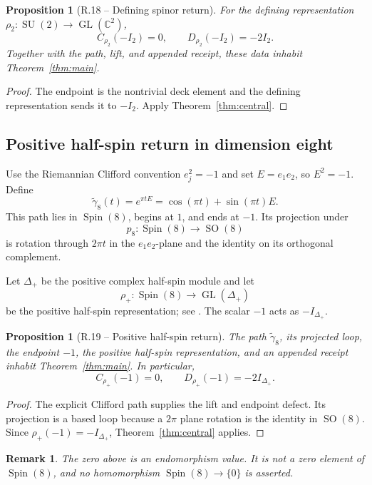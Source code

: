 \documentclass[11pt,letterpaper]{article}
\theoremstyle{returnstyle}
\newtheorem{proposition}[theorem]{Proposition}
\newtheorem{remark}[theorem]{Remark}
\newcommand{\C}{\mathbb{C}}
\newcommand{\GL}{\operatorname{GL}}
\newcommand{\SO}{\operatorname{SO}}
\newcommand{\SU}{\operatorname{SU}}
\newcommand{\Spin}{\operatorname{Spin}}
\begin{document}
\begin{proposition}[R.18 -- Defining spinor return]
For the defining representation $\rho_2:\SU(2)\to\GL(\C^2)$,
\[
C_{\rho_2}(-I_2)=0,
\qquad
D_{\rho_2}(-I_2)=-2I_2.
\]
Together with the path, lift, and appended receipt, these data inhabit Theorem~\ref{thm:main}.
\end{proposition}

\begin{proof}
The endpoint is the nontrivial deck element and the defining representation sends it to $-I_2$.  Apply Theorem~\ref{thm:central}.
\end{proof}

\subsection{Positive half-spin return in dimension eight}

Use the Riemannian Clifford convention $e_j^2=-1$ and set $E=e_1e_2$, so $E^2=-1$.  Define
\[
\widetilde\gamma_8(t)=e^{\pi tE}=\cos(\pi t)+\sin(\pi t)E.
\]
This path lies in $\Spin(8)$, begins at $1$, and ends at $-1$.  Its projection under
\[
p_8:\Spin(8)\longrightarrow\SO(8)
\]
is rotation through $2\pi t$ in the $e_1e_2$-plane and the identity on its orthogonal complement.

Let $\Delta_+$ be the positive complex half-spin module and let
\[
\rho_+:\Spin(8)\longrightarrow\GL(\Delta_+)
\]
be the positive half-spin representation; see \cite{LawsonMichelsohn}.  The scalar $-1$ acts as $-I_{\Delta_+}$.

\begin{proposition}[R.19 -- Positive half-spin return]
The path $\widetilde\gamma_8$, its projected loop, the endpoint $-1$, the positive half-spin representation, and an appended receipt inhabit Theorem~\ref{thm:main}.  In particular,
\[
C_{\rho_+}(-1)=0,
\qquad
D_{\rho_+}(-1)=-2I_{\Delta_+}.
\]
\end{proposition}

\begin{proof}
The explicit Clifford path supplies the lift and endpoint defect.  Its projection is a based loop because a $2\pi$ plane rotation is the identity in $\SO(8)$.  Since $\rho_+(-1)=-I_{\Delta_+}$, Theorem~\ref{thm:central} applies.
\end{proof}

\begin{remark}
The zero above is an endomorphism value.  It is not a zero element of $\Spin(8)$, and no homomorphism $\Spin(8)\to\{0\}$ is asserted.
\end{remark}
\end{document}

